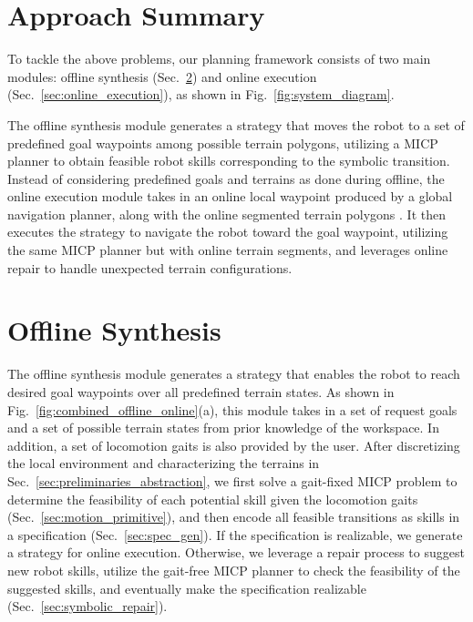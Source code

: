 \documentclass[letterpaper, 10 pt, conference]{ieeeconf}
\begin{document}
\section{Approach Summary}
To tackle the above problems, our planning framework consists of two main modules: 
offline synthesis (Sec.~\ref{sec:reactive_gait_synthesis}) 
and
online execution (Sec.~\ref{sec:online_execution}), as shown in Fig.~\ref{fig:system_diagram}.

The offline synthesis module generates a strategy that moves the robot to a set of predefined goal waypoints among possible terrain polygons,
utilizing a MICP planner to obtain feasible robot skills corresponding to the symbolic transition.
Instead of considering predefined goals and terrains as done during offline, the online execution module
takes in an online local waypoint
produced by a global navigation planner,
along with the online segmented terrain polygons \cite{miki2022elevation}.
%
It then executes the strategy to navigate the robot toward the goal waypoint, 
utilizing the same MICP planner but with online terrain segments,
and leverages online repair 
to handle unexpected terrain configurations.

\section{Offline Synthesis}\label{sec:reactive_gait_synthesis}
The offline synthesis module 
generates a strategy 
that enables the robot
to reach desired goal waypoints over all predefined terrain states.
%
As shown in Fig.~\ref{fig:combined_offline_online}(a),
this module takes in
a set of request goals and
a set of possible terrain states from prior knowledge of the workspace. In addition, a set of locomotion gaits is also provided by the user. After discretizing the local environment and characterizing the terrains in Sec.~\ref{sec:preliminaries_abstraction}, we first solve a gait-fixed MICP problem to determine the feasibility of each potential skill given the locomotion gaits
(Sec.~\ref{sec:motion_primitive}), and then encode all feasible transitions as skills in a specification
(Sec.~\ref{sec:spec_gen}).
If the specification is realizable, we generate a strategy for online execution.
Otherwise, we leverage a repair process to suggest new robot skills, utilize the gait-free MICP planner to check the feasibility of the suggested skills, and eventually make the specification realizable
(Sec.~\ref{sec:symbolic_repair}).
\end{document}
